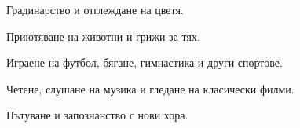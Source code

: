 \cventrytwo
{
\begin{cvitemsone}
\item {Градинарство и отглеждане на цветя.}
\item {Приютяване на животни и грижи за тях.}
\item {Играене на футбол, бягане, гимнастика и други спортове.}
\item {Четене, слушане на музика и гледане на класически филми.}
\item {Пътуване и запознанство с нови хора.}
\end{cvitemsone}
}

\vspace{+1mm}
